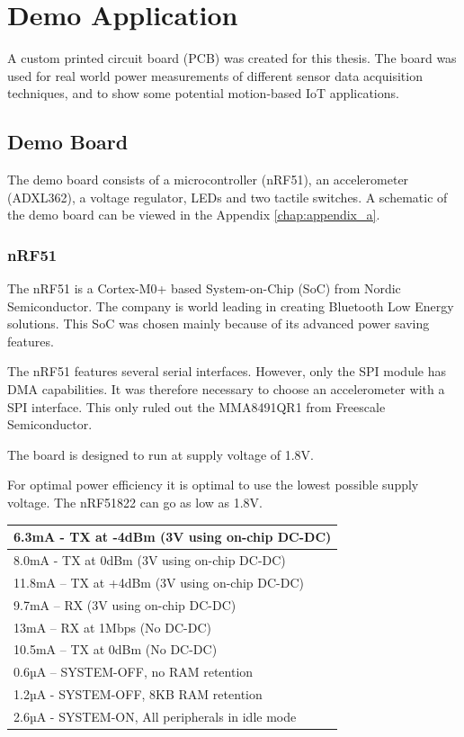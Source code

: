 \chapter{Demo Application}

A custom printed circuit board (PCB) was created for this thesis. The board was used for real world power measurements of different sensor data acquisition techniques, and to show some potential motion-based IoT applications. 

\section{Demo Board}

The demo board consists of a microcontroller (nRF51), an accelerometer (ADXL362), a voltage regulator, LEDs and two tactile switches. A schematic of the demo board can be viewed in the Appendix \ref{chap:appendix_a}. 

\subsection{nRF51}

The nRF51 is a Cortex-M0+ based System-on-Chip (SoC) from Nordic Semiconductor. The company is world leading in creating Bluetooth Low Energy solutions. This SoC was chosen mainly because of its advanced power saving features. 

The nRF51 features several serial interfaces. However, only the SPI module has DMA capabilities. It was therefore necessary to choose an accelerometer with a SPI interface. This only ruled out the MMA8491QR1 from Freescale Semiconductor.

The board is designed to run at supply voltage of 1.8V.

For optimal power efficiency it is optimal to use the lowest possible supply voltage. The nRF51822 can go as low as 1.8V.

\begin{center}
    \begin{tabular}{| l |}
    \hline
    6.3mA - TX at -4dBm (3V using on-chip DC-DC) \\ \hline
    8.0mA - TX at 0dBm (3V using on-chip DC-DC) \\ \hline
    11.8mA – TX at +4dBm (3V using on-chip DC-DC) \\ \hline
    9.7mA – RX (3V using on-chip DC-DC) \\ \hline
    13mA – RX at 1Mbps (No DC-DC) \\ \hline
    10.5mA – TX at 0dBm (No DC-DC) \\ \hline
    0.6µA – SYSTEM-OFF, no RAM retention \\ \hline
    1.2µA - SYSTEM-OFF, 8KB RAM retention \\ \hline
    2.6µA - SYSTEM-ON, All peripherals in idle mode \\ \hline
    \end{tabular}
\end{center}

